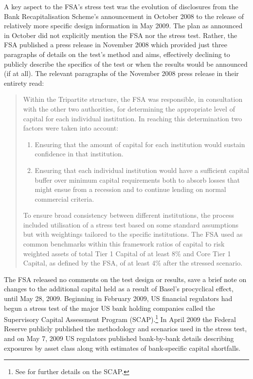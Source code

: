 \documentclass[12pt]{article}
\begin{document}
A key aspect to the FSA's stress test was the evolution of disclosures from the Bank Recapitalisation Scheme's announcement in October 2008 to the release of relatively more specific design information in May 2009. The plan as announced in October did not explicitly mention the FSA nor the stress test. Rather, the FSA published a press release in November 2008 which provided just three paragraphs of details on the test's method and aims, effectively declining to publicly describe the specifics of the test or when the results would be announced (if at all). The relevant paragraphs of the November 2008 press release in their entirety read:

\begin{quote}
 Within the Tripartite structure, the FSA was responsible, in consultation with the other two authorities, for determining the appropriate level of capital for each individual institution. In reaching this determination two factors were taken into account:
 \begin{enumerate}
  \item Ensuring that the amount of capital for each institution would sustain confidence in that institution.
  \item Ensuring that each individual institution would have a sufficient capital buffer over minimum capital requirements both to absorb losses that might ensue from a recession and to continue lending on normal commercial criteria.
 \end{enumerate}
 To ensure broad consistency between different institutions, the process included utilisation of a stress test based on some standard assumptions but with weightings tailored to the specific institutions. The FSA used as common benchmarks within this framework ratios of capital to risk weighted assets of total Tier 1 Capital of at least 8\% and Core Tier 1 Capital, as defined by the FSA, of at least 4\% after the stressed scenario.
\end{quote}

The FSA released no comments on the test design or results, save a brief note on changes to the additional capital held as a result of Basel's procyclical effect, until May 28, 2009. Beginning in February 2009, US financial regulators had begun a stress test of the major US bank holding companies called the Supervisory Capital Assessment Program (SCAP).\footnote{See \citet{Ross2016a} for further details on the SCAP.} In April 2009 the Federal Reserve publicly published the methodology and scenarios used in the stress test, and on May 7, 2009 US regulators published bank-by-bank details describing exposures by asset class along with estimates of bank-specific capital shortfalls.
\end{document}
